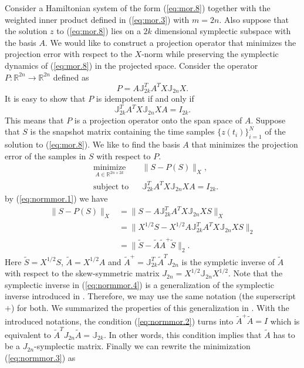 Consider a Hamiltonian system of the form (\ref{eq:mor.8}) together with the weighted inner product defined in (\ref{eq:mor.3}) with $m=2n$. Also suppose that the solution $z$ to (\ref{eq:mor.8}) lies on a $2k$ dimensional symplectic subspace with the basis $A$. We would like to construct a projection operator that minimizes the projection error with respect to the $X$-norm while preserving the symplectic dynamics of (\ref{eq:mor.8}) in the projected space. Consider the operator $P: \mathbb R^{2n} \to \mathbb R^{2n}$ defined as
\begin{equation} \label{eq:normmor.1}
	P = A \mathbb J_{2k}^T A^T X \mathbb J_{2n} X.
\end{equation}
It is easy to show that $P$ is idempotent if and only if
\begin{equation} \label{eq:normmor.2}
	\mathbb J_{2k}^T A^T X \mathbb J_{2n} X A = I_{2k}.
\end{equation}
This means that $P$ is a projection operator onto the span space of $A$. Suppose that $S$ is the snapshot matrix containing the time samples $\{z(t_i)\}_{i=1}^N$ of the solution to (\ref{eq:mor.8}). We like to find the basis $A$ that minimizes the projection error of the samples in $S$ with respect to $P$.
\begin{equation} \label{eq:normmor.3}
\begin{aligned}
& \underset{A\in \mathbb{R}^{2n\times 2k}}{\text{minimize}}
& & \| S - P(S) \|_X, \\
& \text{subject to}
& & \mathbb J_{2k}^T A^T X \mathbb J_{2n} X A = I_{2k}.
\end{aligned}
\end{equation}
by (\ref{eq:normmor.1}) we have
\begin{equation} \label{eq:normmor.4}
\begin{aligned}
	\| S - P(S) \|_X &= \| S - A \mathbb J_{2k}^T A^T X \mathbb J_{2n} X S \|_X \\
	&= \| X^{1/2} S - X^{1/2} A \mathbb J_{2k}^T A^T X \mathbb J_{2n} X S \|_2 \\
	&= \| \tilde S - \tilde A \tilde A ^+ \tilde S \|_2.
\end{aligned}
\end{equation}
Here $\tilde S = X^{1/2} S$, $\tilde A = X^{1/2} A$ and $\tilde A^+ = \mathbb J_{2k}^T \tilde A^T J_{2n}$ is the sympletic inverse of $\tilde A$ with respect to the skew-symmetric matrix $J_{2n} = X^{1/2} \mathbb J_{2n} X^{1/2}$. Note that the symplectic inverse in (\ref{eq:normmor.4}) is a generalization of the symplectic inverse introduced in . Therefore, we may use the same notation (the superscript $+$) for both. We summarized the properties of this generalization in . With the introduced notations, the condition (\ref{eq:normmor.2}) turns into $\tilde A ^+ \tilde A = I$ which is equivalent to $\tilde A ^T J_{2n} \tilde A = \mathbb J_{2k}$. In other words, this condition implies that $\tilde A$ has to be a $J_{2n}$-symplectic matrix. Finally we can rewrite the minimization (\ref{eq:normmor.3}) as
